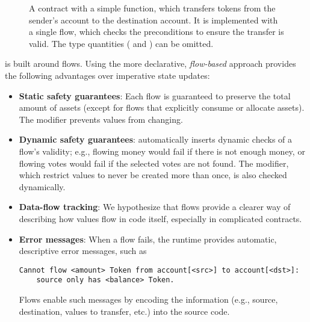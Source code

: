 \documentclass[dvipsnames,runningheads]{llncs}
\begin{document}
\begin{figure}[t]
    \centering
    
    \vspace{-1em}
    \caption{A \langName contract with a simple  function, which transfers  tokens from the sender's account to the destination account.
It is implemented with a single flow, which checks the preconditions to ensure the transfer is valid.
The type quantities ( and ) can be omitted.}
    \label{fig:erc20-transfer-flow}
    \vspace{-2em}
\end{figure}

\langName is built around flows.
Using the more declarative, \emph{flow-based} approach provides the following advantages over imperative state updates:
\begin{itemize}
    \item \textbf{Static safety guarantees}: Each flow is guaranteed to preserve the total amount of assets (except for flows that explicitly consume or allocate assets). %
        The  modifier prevents values from changing.
    \item \textbf{Dynamic safety guarantees}: \langName automatically inserts dynamic checks of a flow's validity; e.g., flowing money would fail if there is not enough money, or flowing votes would fail if the selected votes are not found.
        The  modifier, which restrict values to never be created more than once, is also checked dynamically.
    \item \textbf{Data-flow tracking}: We hypothesize that flows provide a clearer way of describing how values flow in code itself, especially in complicated contracts.
    \item \textbf{Error messages}: When a flow fails, the \langName runtime provides automatic, descriptive error messages, such as
\begin{lstlisting}[numbers=none, basicstyle=\small\ttfamily]
Cannot flow <amount> Token from account[<src>] to account[<dst>]:
    source only has <balance> Token.
\end{lstlisting}
        Flows enable such messages by encoding the information (e.g., source, destination, values to transfer, etc.) into the source code.
\end{itemize}
\end{document}
